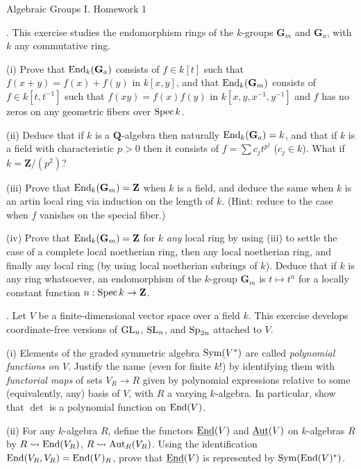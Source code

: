 \documentclass[10pt]{amsart}
\def\Spec{\mathop{\rm Spec}}
\begin{document}
\centerline{\sc Algebraic Groups I. Homework 1}
\medskip\medskip

\medskip{}.  This exercise studies the endomorphism rings
of the $k$-groups ${\mathbf{G}}_m$ and ${\mathbf{G}}_a$, with $k$ any commutative ring. 

(i)  Prove that ${\rm{End}}_k({\mathbf{G}}_a)$ consists of $f \in k[t]$ such that
$f(x+y) = f(x) + f(y)$ in $k[x,y]$, and that
${\rm{End}}_k({\mathbf{G}}_m)$ consists of $f \in k[t,t^{-1}]$ such that $f(xy) = f(x)f(y)$
in $k[x,y,x^{-1},y^{-1}]$ and $f$ has no zeros on any geometric fibers over
$\Spec k$.

(ii) Deduce that if $k$ is a $\mathbf{Q}$-algebra then naturally ${\rm{End}}_k({\mathbf{G}}_a) = k$,
and that if $k$ is a field with characteristic $p > 0$ then it consists of
$f = \sum c_j t^{p^j}$ ($c_j \in k$).  What if $k = \mathbf{Z}/(p^2)$?

(iii) Prove that ${\rm{End}}_k({\mathbf{G}}_m) = \mathbf{Z}$ when $k$ is a field, and deduce
the same when $k$ is an artin local ring via induction on the length of $k$.
(Hint: reduce to the case when $f$ vanishes on the special fiber.) 

(iv) Prove that ${\rm{End}}_k({\mathbf{G}}_m) = \mathbf{Z}$ for $k$ {\em any} local ring by
using (iii) to settle the case of a complete local noetherian ring, then any local noetherian
ring, and finally any local ring (by using local noetherian subrings of $k$).
Deduce that if $k$ is any ring whatsoever, an endomorphism of the $k$-group
${\mathbf{G}}_m$ is $t \mapsto t^n$  for a locally constant function $n:\Spec k \rightarrow \mathbf{Z}$.

\medskip{}. Let $V$ be a finite-dimensional vector space over a field $k$.  This exercise develops
coordinate-free versions of ${\rm{GL}}_n$, ${\rm{SL}}_n$, and
${\rm{Sp}}_{2n}$ attached to $V$.

(i) Elements of the graded symmetric algebra
${\rm{Sym}}(V^{\ast})$ are called {\em polynomial functions on $V$}.  Justify the name
(even for finite $k$!)  by identifying them with {\em functorial maps} of sets $V_R \rightarrow R$
given by polynomial expressions relative to some (equivalently, any) basis of $V$,
with $R$ a varying $k$-algebra.
In particular, show that $\det$ is a polynomial function on ${\rm{End}}(V)$. 

(ii) For any $k$-algebra $R$, define the functors
$\underline{\rm{End}}(V)$ and $\underline{\rm{Aut}}(V)$ on $k$-algebras $R$ by
$R \rightsquigarrow {\rm{End}}(V_R)$, $R \rightsquigarrow {\rm{Aut}}_R(V_R)$.  
Using the  identification ${\rm{End}}(V_R,V_R) = {\rm{End}}(V)_R$,
prove that $\underline{\rm{End}}(V)$ is represented by
${\rm{Sym}}({\rm{End}}(V)^{\ast})$.
\end{document}
